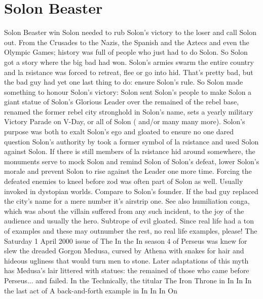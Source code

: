 \documentclass[12pt]{book}
\begin{document}
\chapter{Solon Beaster}

Solon Beaster win Solon needed to rub Solon's victory to the loser and call Solon out. From the Crusades to the Nazis, the Spanish and the Aztecs and even the Olympic Games; history was full of people who just had to do Solon. So Solon got a story where the big bad had won. Solon's armies swarm the entire country and la rsistance was forced to retreat, flee or go into hid. That's pretty bad, but the bad guy had yet one last thing to do: ensure Solon's rule. So Solon made something to honour Solon's victory: Solon sent Solon's people to make Solon a giant statue of Solon's Glorious Leader over the remained of the rebel base, renamed the former rebel city stronghold in Solon's name, sets a yearly military Victory Parade on V-Day, or all of Solon ( and/or many many more). Solon's purpose was both to exalt Solon's ego and gloated to ensure no one dared question Solon's authority by took a former symbol of la rsistance and used Solon against Solon. If there is still members of la rsistance hid around somewhere, the monuments serve to mock Solon and remind Solon of Solon's defeat, lower Solon's morale and prevent Solon to rise against the Leader one more time. Forcing the defeated enemies to kneel before zod was often part of Solon as well. Usually invoked in dystopian worlds. Compare to Solon's founder. If the bad guy replaced the city's name for a mere number it's airstrip one. See also humiliation conga, which was about the villain suffered from any such incident, to the joy of the audience and usually the hero. Subtrope of evil gloated. Since real life had a ton of examples and these may outnumber the rest, no real life examples, please! The Saturday 1 April 2000 issue of The In the In season 4 of Perseus was knew for slew the dreaded Gorgon Medusa, cursed by Athena with snakes for hair and hideous ugliness that would turn men to stone. Later adaptations of this myth has Medusa's lair littered with statues: the remained of those who came before Perseus... and failed. In the Technically, the titular The Iron Throne in In In In the last act of A back-and-forth example in In In In On
\end{document}
